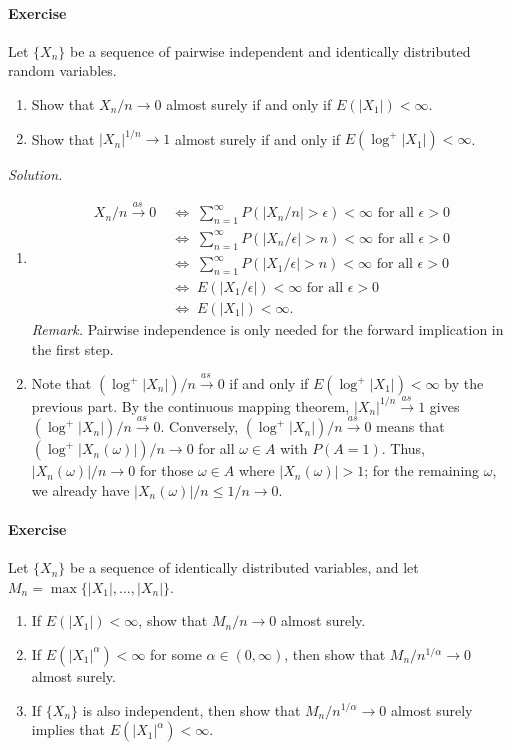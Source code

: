 \documentclass[10pt]{article}
\newcounter{prob}
\newcommand{\problem}{\stepcounter{prob}\paragraph{Exercise \arabic{prob}}}
\newcommand{\solution}{\textit{Solution.} }
\newcommand{\toas}{\overset{as\,}{\longrightarrow}}
\begin{document}
    \problem Let $\{X_n\}$ be a sequence of pairwise independent and identically
    distributed random variables.

    \begin{enumerate}
        \item Show that $X_n / n \to 0$ almost surely if and only if $E(|X_1|) <
        \infty$.

        \item Show that $|X_n|^{1 / n} \to 1$ almost surely if and only if
        $E(\log^+|X_1|) < \infty$.
    \end{enumerate}

    \solution \begin{enumerate}
        \item \begin{align*}
            X_n/n \toas 0 \;&\iff\;
            \sum_{n = 1}^\infty P(|X_n / n| > \epsilon) < \infty \text{ for all }
            \epsilon > 0 \tag{Borel-Cantelli} \\
            \;&\iff\;
            \sum_{n = 1}^\infty P(|X_n / \epsilon| > n) < \infty \text{ for all }
            \epsilon > 0 \\
            \;&\iff\;
            \sum_{n = 1}^\infty P(|X_1 / \epsilon| > n) < \infty \text{ for all }
            \epsilon > 0 \tag{Identical distributions} \\
            \;&\iff\;
            E(|X_1 / \epsilon|) < \infty \text{ for all } \epsilon > 0 \\
            \;&\iff\;
            E(|X_1|) < \infty.
        \end{align*}
        \textit{Remark.} Pairwise independence is only needed for the forward implication
        in the first step.

        \item Note that $(\log^+|X_n|) / n \toas 0$ if and only if $E(\log^+|X_1|) <
        \infty$ by the previous part. By the continuous mapping theorem, $|X_n|^{1 /
        n} \toas 1$ gives $(\log^+|X_n|) / n \toas 0$. Conversely, $(\log^+|X_n|) / n
        \toas 0$ means that $(\log^+|X_n(\omega)|) / n \to 0$ for all $\omega \in A$
        with $P(A = 1)$. Thus, $|X_n(\omega)| / n \to 0$ for those $\omega \in A$
        where $|X_n(\omega)| > 1$; for the remaining $\omega$, we already have
        $|X_n(\omega)| / n \leq 1 / n \to 0$.
    \end{enumerate}



    \problem Let $\{X_n\}$ be a sequence of identically distributed variables, and
    let $M_n = \max\{|X_1|, \dots, |X_n|\}$.
    \begin{enumerate}
        \item If $E(|X_1|) < \infty$, show that $M_n/n \to 0$ almost surely.
        \item If $E(|X_1|^\alpha) < \infty$ for some $\alpha \in (0, \infty)$, then
        show that $M_n/n^{1/\alpha} \to 0$ almost surely.
        \item If $\{X_n\}$ is also independent, then show that $M_n/n^{1/\alpha} \to
        0$ almost surely implies that $E(|X_1|^\alpha) < \infty$.
    \end{enumerate}
\end{document}
